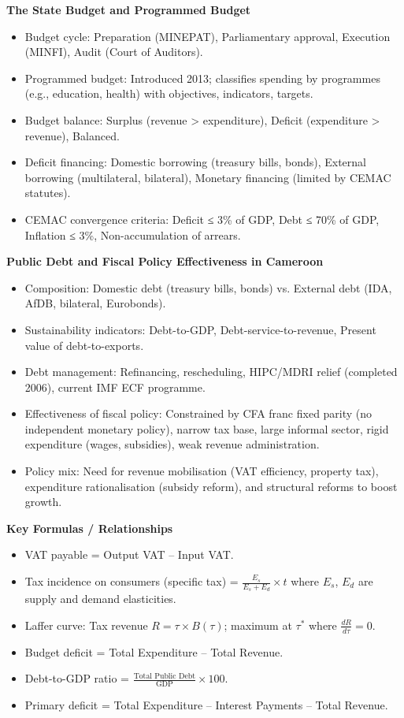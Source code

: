 \documentclass[11pt]{article}
\newcommand{\cle}[1]{{\popxbold\color{popdark}#1}}
\begin{document}
\begin{bilan}
\textbf{The State Budget and Programmed Budget}
\begin{itemize}
\item \cle{Budget cycle}: Preparation (MINEPAT), Parliamentary approval, Execution (MINFI), Audit (Court of Auditors).
\item \cle{Programmed budget}: Introduced 2013; classifies spending by \cle{programmes} (e.g., education, health) with objectives, indicators, targets.
\item \cle{Budget balance}: Surplus (revenue > expenditure), Deficit (expenditure > revenue), Balanced.
\item \cle{Deficit financing}: Domestic borrowing (treasury bills, bonds), External borrowing (multilateral, bilateral), Monetary financing (limited by CEMAC statutes).
\item \cle{CEMAC convergence criteria}: Deficit ≤ 3\% of GDP, Debt ≤ 70\% of GDP, Inflation ≤ 3\%, Non-accumulation of arrears.
\end{itemize}

\textbf{Public Debt and Fiscal Policy Effectiveness in Cameroon}
\begin{itemize}
\item \cle{Composition}: Domestic debt (treasury bills, bonds) vs. External debt (IDA, AfDB, bilateral, Eurobonds).
\item \cle{Sustainability indicators}: Debt-to-GDP, Debt-service-to-revenue, Present value of debt-to-exports.
\item \cle{Debt management}: Refinancing, rescheduling, HIPC/MDRI relief (completed 2006), current IMF ECF programme.
\item \cle{Effectiveness of fiscal policy}: Constrained by CFA franc fixed parity (no independent monetary policy), narrow tax base, large informal sector, rigid expenditure (wages, subsidies), weak revenue administration.
\item \cle{Policy mix}: Need for revenue mobilisation (VAT efficiency, property tax), expenditure rationalisation (subsidy reform), and structural reforms to boost growth.
\end{itemize}

\textbf{Key Formulas / Relationships}
\begin{itemize}
\item VAT payable = Output VAT – Input VAT.
\item Tax incidence on consumers (specific tax) = $\frac{E_s}{E_s+E_d} \times t$ where $E_s$, $E_d$ are supply and demand elasticities.
\item Laffer curve: Tax revenue $R = \tau \times B(\tau)$; maximum at $\tau^*$ where $\frac{dR}{d\tau}=0$.
\item Budget deficit = Total Expenditure – Total Revenue.
\item Debt-to-GDP ratio = $\frac{\text{Total Public Debt}}{\text{GDP}} \times 100$.
\item Primary deficit = Total Expenditure – Interest Payments – Total Revenue.
\end{itemize}


\end{bilan}
\end{document}
